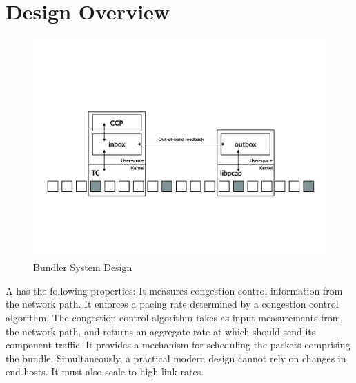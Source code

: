 \section{Design Overview}\label{s:design}
\begin{figure}
    \centering
    \includegraphics[width=2\columnwidth]{img/bundler-diagram}
    \caption{Bundler System Design}\label{fig:bundler}
\end{figure}

\begin{outline}
\1 A \name has the following properties:
    \2 It measures congestion control information from the network path.
    \2 It enforces a pacing rate determined by a congestion control algorithm.
        \3 The congestion control algorithm takes as input measurements from the network path, and returns an aggregate rate at which \name should send its component traffic.
    \2 It provides a mechanism for scheduling the packets comprising the bundle.
\1 Simultaneously, a practical modern design cannot rely on changes in end-hosts.
\1 It must also scale to high link rates.
\end{outline}

